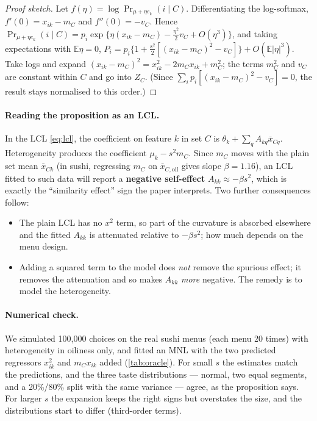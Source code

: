 \documentclass[11pt,a4paper]{article}
\theoremstyle{remark}
\newcommand{\xb}{\bar{x}}
\newcommand{\E}{\mathbb{E}}
\begin{document}
\begin{proof}[Proof sketch]
Let $f(\eta)=\log\Pr_{\mu+\eta e_k}(i\mid C)$. Differentiating the log-softmax, $f'(0)=x_{ik}-m_C$ and
$f''(0)=-v_C$. Hence $\Pr_{\mu+\eta e_k}(i\mid C)=p_i\exp\{\eta(x_{ik}-m_C)-\tfrac{\eta^2}{2}v_C+O(\eta^3)\}$,
and taking expectations with $\E\eta=0$,
$P_i=p_i\{1+\tfrac{s^2}{2}[(x_{ik}-m_C)^2-v_C]\}+O(\E|\eta|^3)$. Take logs and expand
$(x_{ik}-m_C)^2=x_{ik}^2-2m_Cx_{ik}+m_C^2$; the terms $m_C^2$ and $v_C$ are constant within $C$ and go
into $Z_C$. (Since $\sum_ip_i[(x_{ik}-m_C)^2-v_C]=0$, the result stays normalised to this order.)
\end{proof}

\paragraph{Reading the proposition as an LCL.}
In the LCL \eqref{eq:lcl}, the coefficient on feature $k$ in set $C$ is $\theta_k+\sum_qA_{kq}\xb_{Cq}$.
Heterogeneity produces the coefficient $\mu_k-s^2m_C$. Since $m_C$ moves with the plain set mean
$\xb_{Ck}$ (in sushi, regressing $m_C$ on $\xb_{C,\mathrm{oil}}$ gives slope $\beta=1.16$), an LCL fitted
to such data will report a \textbf{negative self-effect} $A_{kk}\approx-\beta s^2$, which is exactly the
``similarity effect'' sign the paper interprets. Two further consequences follow:
\begin{itemize}
\item The plain LCL has no $x^2$ term, so part of the curvature is absorbed elsewhere and the
      fitted $A_{kk}$ is attenuated relative to $-\beta s^2$; how much depends on the menu design.
\item Adding a squared term to the model does \emph{not} remove the spurious effect; it removes the
      attenuation and so makes $A_{kk}$ \emph{more} negative. The remedy is to model the heterogeneity.
\end{itemize}

\paragraph{Numerical check.}
We simulated 100{,}000 choices on the real sushi menus (each menu 20 times) with heterogeneity in
oiliness only, and fitted an MNL with the two predicted regressors $x_{ik}^2$ and $m_Cx_{ik}$ added
(\cref{tab:oracle}). For small $s$ the estimates match the predictions, and the three taste distributions
--- normal, two equal segments, and a 20\%/80\% split with the same variance --- agree, as the proposition
says. For larger $s$ the expansion keeps the right signs but overstates the size, and the distributions
start to differ (third-order terms).
\end{document}
